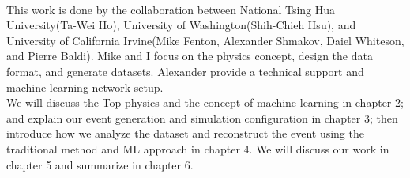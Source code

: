 \\
This work is done by the collaboration between National Tsing Hua University(Ta-Wei Ho), University of Washington(Shih-Chieh Hsu), and University of California Irvine(Mike Fenton, Alexander Shmakov, Daiel Whiteson, and Pierre Baldi). Mike and I focus on the physics concept, design the data format, and generate datasets. Alexander provide a technical support and machine learning network setup. 
\\
We will discuss the Top physics and the concept of machine learning in chapter 2; and explain our event generation and simulation configuration in chapter 3; then introduce how we analyze the dataset and reconstruct the event using the traditional method and ML approach in chapter 4. We will discuss our work in chapter 5 and summarize in chapter 6.



